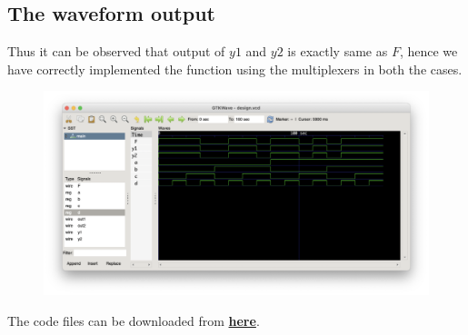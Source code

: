 \documentclass[12pt]{article}
\begin{document}
\subsection{The waveform output}
Thus it can be observed that output of $y1$ and $y2$ is exactly same as $F$, hence we have correctly implemented the function using the multiplexers in both the cases.
\begin{figure}[H]
  \centering
  \includegraphics[width=1\textwidth]{plot.png}
  \end{figure}
The code files can be downloaded from \href{https://drive.google.com/uc?export=download&id=1I1zmg8S1jMNQBCqtZEEszLOsPr9Juvdl}{\textbf{here}}.
\end{document}
